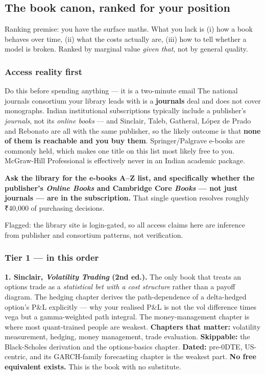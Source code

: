 \documentclass[11pt,a4paper]{article}
\newcommand{\rs}{₹}
\newcommand{\srcnote}[1]{{\footnotesize\color{soft}#1\par}}
\begin{document}
\subsection{The book canon, ranked for your position}

Ranking premise: you have the surface maths. What you lack is (i) how a book
behaves over time, (ii) what the costs actually are, (iii) how to tell whether a
model is broken. Ranked by marginal value \emph{given that}, not by general quality.

\subsubsection{Access reality first}

\begin{keyfact}{Do this before spending anything --- it is a two-minute email}
The national journals consortium your library leads with is a \textbf{journals}
deal and does not cover monographs. Indian institutional subscriptions typically
include a publisher's \emph{journals}, not its \emph{online books} --- and Sinclair,
Taleb, Gatheral, L\'opez de Prado and Rebonato are all with the same publisher, so
the likely outcome is that \textbf{none of them is reachable and you buy them}.
Springer/Palgrave e-books are commonly held, which makes one title on this list
most likely free to you. McGraw-Hill Professional is effectively never in an Indian
academic package.

\textbf{Ask the library for the e-books A--Z list, and specifically whether the
publisher's \emph{Online Books} and Cambridge Core \emph{Books} --- not just
journals --- are in the subscription.} That single question resolves roughly
\rs 40{,}000 of purchasing decisions.
\srcnote{Flagged: the library site is login-gated, so all access claims here are
inference from publisher and consortium patterns, not verification.}
\end{keyfact}

\subsubsection{Tier 1 --- in this order}

\textbf{1. Sinclair, \emph{Volatility Trading} (2nd ed.).} The only book that
treats an options trade as a \emph{statistical bet with a cost structure} rather
than a payoff diagram. The hedging chapter derives the path-dependence of a
delta-hedged option's P\&L explicitly --- why your realised P\&L is not the vol
difference times vega but a gamma-weighted path integral. The money-management
chapter is where most quant-trained people are weakest. \textbf{Chapters that
matter:} volatility measurement, hedging, money management, trade evaluation.
\textbf{Skippable:} the Black-Scholes derivation and the options-basics chapter.
\textbf{Dated:} pre-0DTE, US-centric, and its GARCH-family forecasting chapter is
the weakest part. \textbf{No free equivalent exists.} This is the book with no
substitute.
\end{document}

